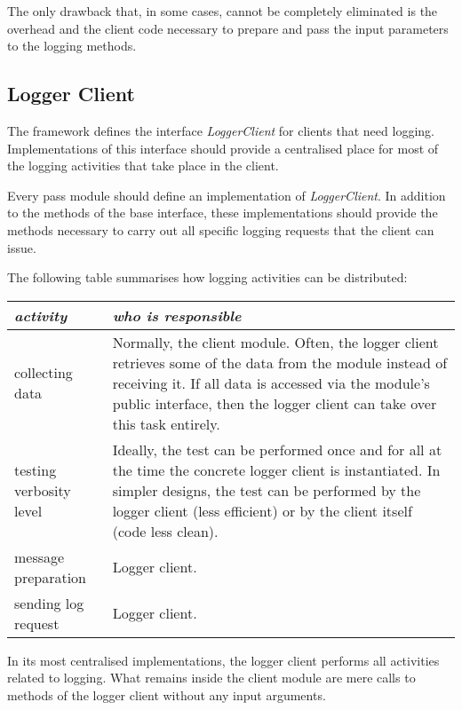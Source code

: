 \documentclass[a4paper,twoside]{tce}
\begin{document}
The only drawback that, in some cases, cannot be completely eliminated is
the overhead and the client code necessary to prepare and pass the input
parameters to the logging methods.

\subsection{Logger Client}
\label{ssec:LoggerClient}

The framework defines the interface \emph{LoggerClient} for clients that
need logging. Implementations of this interface should provide a centralised
place for most of the logging activities that take place in the client.

Every pass module should define an implementation of \emph{LoggerClient}. In
addition to the methods of the base interface, these implementations should
provide the methods necessary to carry out all specific logging requests
that the client can issue.

The following table summarises how logging activities can be distributed:

\begin{flushleft}
\begin{tabular}[h]{|p{}|p{}|}
  \hline
  \emph{activity} & \emph{who is responsible} \\
  \hline

  collecting data &
%
  Normally, the client module. Often, the logger client retrieves some of
  the data from the module instead of receiving it. If all data is accessed
  via the module's public interface, then the logger client can take over
  this task entirely.\\
  \hline

  testing verbosity level &
%
  Ideally, the test can be performed once and for all at the time the
  concrete logger client is instantiated. In simpler designs, the test can
  be performed by the logger client (less efficient) or by the client itself
  (code less clean).\\
  \hline

  message preparation &
%
  Logger client.\\
  \hline

  sending log request &
%
  Logger client.\\
  \hline
\end{tabular}
\end{flushleft}

In its most centralised implementations, the logger client performs all
activities related to logging. What remains inside the client module are
mere calls to methods of the logger client without any input arguments.
\end{document}
